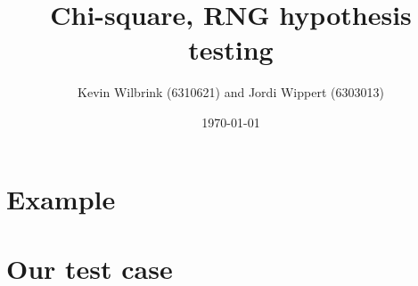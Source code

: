 \documentclass[12pt]{article}
\title{\textbf{Chi-square, RNG hypothesis testing}}
\date{\today}
\author{Kevin Wilbrink (6310621) and Jordi Wippert (6303013)}
\begin{document}
	\maketitle

	\begin{multicols*}{2}
		\section{Example}
		
		\section{Our test case}
		
		\printbibliography
	\end{multicols*}
\end{document}
